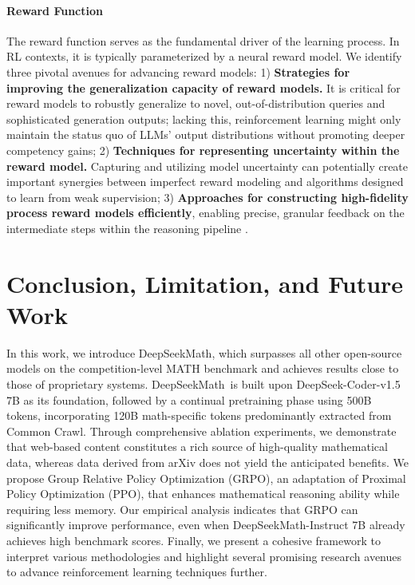 \begin{itemize}[topsep=0pt]
\begin{itemize}[topsep=0pt]
\paragraph{Reward Function} The reward function serves as the fundamental driver of the learning process. In RL contexts, it is typically parameterized by a neural reward model. We identify three pivotal avenues for advancing reward models: 1) \textbf{Strategies for improving the generalization capacity of reward models.} It is critical for reward models to robustly generalize to novel, out-of-distribution queries and sophisticated generation outputs; lacking this, reinforcement learning might only maintain the status quo of LLMs' output distributions without promoting deeper competency gains; 2) \textbf{Techniques for representing uncertainty within the reward model.} Capturing and utilizing model uncertainty can potentially create important synergies between imperfect reward modeling and algorithms designed to learn from weak supervision; 3) \textbf{Approaches for constructing high-fidelity process reward models efficiently}, enabling precise, granular feedback on the intermediate steps within the reasoning pipeline \citep{lightman2023let,wang2023math}.

\section{Conclusion, Limitation, and Future Work} In this work, we introduce DeepSeekMath, which surpasses all other open-source models on the competition-level MATH benchmark and achieves results close to those of proprietary systems. DeepSeekMath~is built upon DeepSeek-Coder-v1.5 7B as its foundation, followed by a continual pretraining phase using 500B tokens, incorporating 120B math-specific tokens predominantly extracted from Common Crawl. Through comprehensive ablation experiments, we demonstrate that web-based content constitutes a rich source of high-quality mathematical data, whereas data derived from arXiv does not yield the anticipated benefits. We propose Group Relative Policy Optimization (GRPO), an adaptation of Proximal Policy Optimization (PPO), that enhances mathematical reasoning ability while requiring less memory. Our empirical analysis indicates that GRPO can significantly improve performance, even when DeepSeekMath-Instruct 7B already achieves high benchmark scores. Finally, we present a cohesive framework to interpret various methodologies and highlight several promising research avenues to advance reinforcement learning techniques further.


\end{itemize}
\end{itemize}
